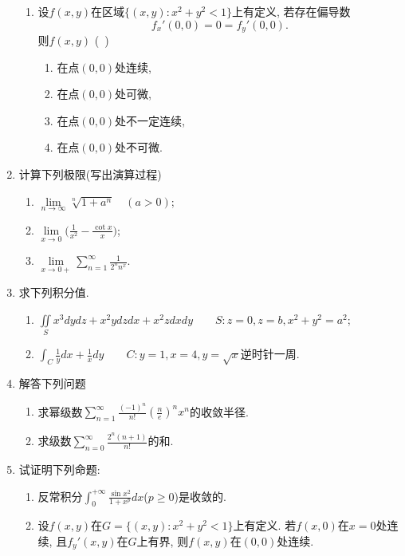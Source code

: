 \documentclass[12pt,a4paper,openany]{book}
\begin{document}
\begin{enumerate}
\begin{enumerate}
\item 设$f(x, y)$在区域$\{ (x, y) : x^2 + y^2 < 1 \}$上有定义, 若存在偏导数
\[
f_x'(0, 0) = 0 = f_y'(0, 0).
\]
则$f(x, y)$ \hfill (\ )
\begin{enumerate}
\item 在点$(0, 0)$处连续,
\item 在点$(0, 0)$处可微,
\item 在点$(0, 0)$处不一定连续,
\item 在点$(0, 0)$处不可微.
\end{enumerate}
\end{enumerate}

\item 计算下列极限(写出演算过程)
\begin{enumerate}
\item $\lim\limits_{n \rightarrow \infty}{\sqrt[n]{1 + a^n}} \quad (a > 0)$;
\item $\lim\limits_{x \rightarrow 0}{(\displaystyle\frac{1}{x^2} - \frac{\cot{x}}{x}})$;
\item $\lim\limits_{x \rightarrow 0+}{\displaystyle\sum\limits_{n=1}^{\infty}{\frac{1}{2^nn^x}}}$.
\end{enumerate}

\item 求下列积分值.
\begin{enumerate}
\item $\displaystyle\iint\limits_{S}{x^3dydz + x^2ydzdx + x^2zdxdy} \qquad S: z = 0, z = b, x^2 + y^2 = a^2$;
\item $\displaystyle\int_{C}{\frac{1}{y}dx + \frac{1}{x}dy} \qquad C: y = 1, x= 4, y = \sqrt{x}$逆时针一周.
\end{enumerate}

\item 解答下列问题
\begin{enumerate}
\item 求幂级数$\displaystyle\sum\limits_{n=1}^{\infty}{\frac{(-1)^n}{n!}(\frac{n}{e})^nx^n}$的收敛半径.
\item 求级数$\displaystyle\sum\limits_{n=0}^{\infty}{\frac{2^n(n+1)}{n!}}$的和.
\end{enumerate}

\item 试证明下列命题:
\begin{enumerate}
\item 反常积分$\displaystyle\int_{0}^{+\infty}{\frac{\sin{x^2}}{1 + x^p}dx}$($p \ge 0$)是收敛的.
\item 设$f(x, y)$在$G = \{ (x, y): x^2 + y^2 < 1\}$上有定义. 若$f(x, 0)$在$x = 0$处连续, 且$f_y'(x, y)$在$G$上有界, 则$f(x, y)$在$(0, 0)$处连续.
\end{enumerate}
\end{enumerate}
\end{document}
